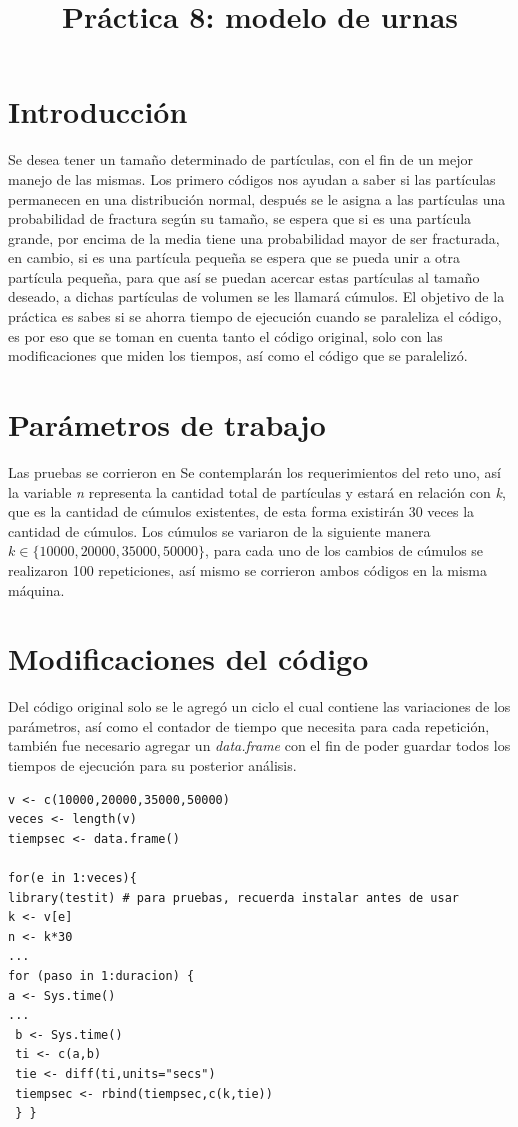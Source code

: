 \documentclass[a4paper]{article}
\title{Práctica 8: modelo de urnas}
\begin{document}
\maketitle

\section{Introducci\'on}
Se desea tener un tamaño determinado de partículas, con el fin de un mejor manejo de las mismas. Los primero códigos nos ayudan a saber si las partículas permanecen en una distribución normal, después se le asigna a las partículas una probabilidad de fractura según su tamaño, se espera que si es una partícula grande, por encima de la media tiene una probabilidad mayor de ser fracturada, en cambio, si es una partícula pequeña se espera que se pueda unir a otra partícula pequeña, para que así se puedan acercar estas partículas al tamaño deseado, a dichas partículas de volumen se les llamará cúmulos. El objetivo de la práctica es sabes si se ahorra tiempo de ejecución cuando se paraleliza el código, es por eso que se toman en cuenta tanto el código original, solo con las modificaciones que miden los tiempos, así como el código que se paralelizó.

\section{Par\'ametros de trabajo}
Las pruebas se corrieron en 
Se contemplarán los requerimientos del reto uno, así la variable \textit{n} representa la cantidad total de partículas y estará en relación con \textit{k}, que es la cantidad de cúmulos existentes, de esta forma existirán $30$ veces la cantidad de cúmulos. Los cúmulos se variaron de la siguiente manera $k\in\{10000,20000,35000,50000\}$, para cada uno de los cambios de cúmulos se realizaron 100 repeticiones, así mismo se corrieron ambos códigos en la misma máquina.

\section{Modificaciones del código}
Del código original solo se le agregó un ciclo el cual contiene las variaciones de los parámetros, así como el contador de tiempo que necesita para cada repetición, también fue necesario agregar un \textit{data.frame} con el fin de poder guardar todos los tiempos de ejecución para su posterior análisis.

\begin{lstlisting}[frame=single]
v <- c(10000,20000,35000,50000)
veces <- length(v)
tiempsec <- data.frame()

for(e in 1:veces){
library(testit) # para pruebas, recuerda instalar antes de usar
k <- v[e]
n <- k*30
...
for (paso in 1:duracion) {
a <- Sys.time()
...
 b <- Sys.time()
 ti <- c(a,b)
 tie <- diff(ti,units="secs")
 tiempsec <- rbind(tiempsec,c(k,tie))
 } }
\end{lstlisting}
\end{document}
